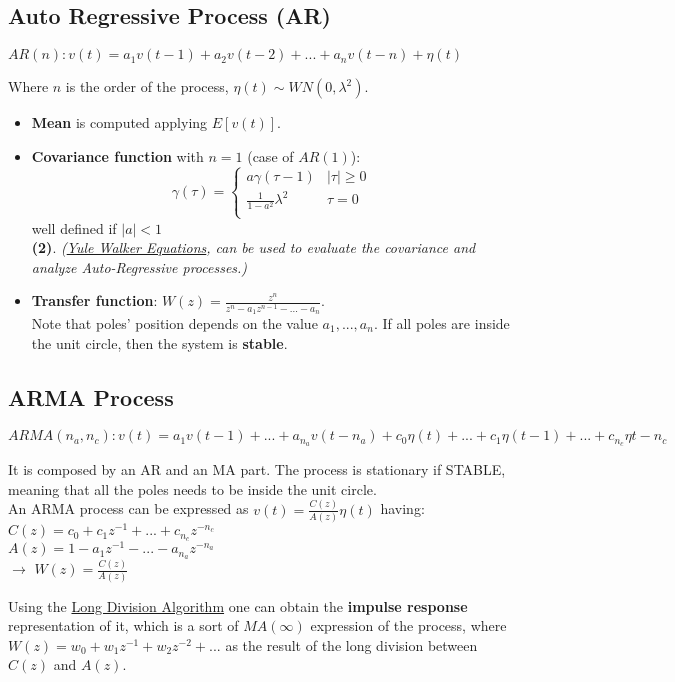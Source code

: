 \documentclass[10pt,a4paper]{article}
\begin{document}
\subsection{Auto Regressive Process (AR)}
\center 
$AR(n) : v(t) = a_1v(t-1)+a_2v(t-2)+...+a_nv(t-n) + \eta(t)$
\\
\vspace{0.5em}
\raggedright
Where $n$ is the order of the process, $\eta(t) \sim WN(0,\lambda^2)$. \\
\begin{itemize}
	\item \textbf{Mean} is computed applying $E[v(t)]$.
	\item \textbf{Covariance function} with $n=1$ (case of $AR(1)$):
	\begin{equation}
  		\gamma(\tau) =
    		\begin{cases}
      			a\gamma(\tau-1) & |\tau| \geq 0\\
      			\frac{1}{1-a^2} \lambda^2 & \tau=0\\
    \end{cases}       
\end{equation}
	well defined if $|a|<1$ \\ 
	\textbf{(2)}. \textit{(\uline{Yule Walker Equations}, can be used to evaluate the covariance and analyze Auto-Regressive processes.)}
	\item \textbf{Transfer function}: $W(z)=\frac{z^n}{z^n-a_1z^{n-1}-...-a_n}$. \\
	\vspace{0.5em}
	Note that poles' position depends on the value $a_1, ..., a_n$. If all poles are inside the unit circle, then the system is \textbf{stable}.
\end{itemize}
\subsection{ARMA Process}
\center 
$ARMA(n_a,n_c) : v(t) = a_1v(t-1)+...+a_{n_a}v(t-n_a) + c_0\eta(t) + ... + c_1\eta(t-1) + ... + c_{n_c}\eta{t-n_c}$
\\
\vspace{1em}
\raggedright
It is composed by an AR and an MA part. The process is stationary if STABLE, meaning that all the poles needs to be inside the unit circle. \\
An ARMA process can be expressed as $v(t)=\frac{C(z)}{A(z)}\eta(t)$ having:
\center
 $C(z)=c_0+c_1z^{-1}+...+c_{n_c}z^{-n_c}$\\ $A(z)=1-a_1z^{-1}-...-a_{n_a}z^{-n_a}$
 \\
$\rightarrow$ $W(z) = \frac{C(z)}{A(z)}$
\\ \raggedright \vspace{0.5em}
Using the \uline{Long Division Algorithm} one can obtain the \textbf{impulse response} representation of it, which is a sort of $MA(\infty)$ expression of the process, where $W(z)=w_0+w_1z^{-1}+w_2z^{-2}+...$ as the result of the long division between $C(z)$ and $A(z)$.
\pagebreak
\end{document}
